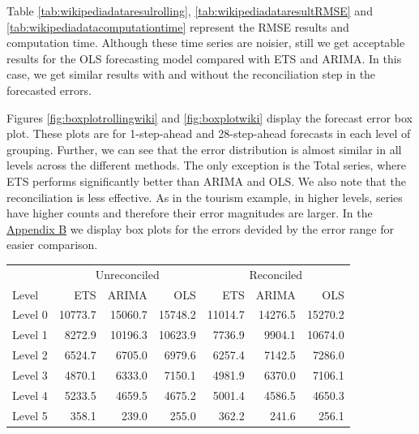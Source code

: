 \documentclass[11pt,a4paper,]{article}
\let\origtable\table
\let\endorigtable\endtable
\renewenvironment{table}[1][2] {
    \expandafter\origtable\expandafter[!htbp]
} {
    \endorigtable
}
\begin{document}
Table \ref{tab:wikipediadataresulrolling}, \ref{tab:wikipediadataresultRMSE} and \ref{tab:wikipediadatacomputationtime} represent the RMSE results and computation time. Although these time series are noisier, still we get acceptable results for the OLS forecasting model compared with ETS and ARIMA. In this case, we get similar results with and without the reconciliation step in the forecasted errors.

Figures \ref{fig:boxplotrollingwiki} and \ref{fig:boxplotwiki} display the forecast error box plot. These plots are for 1-step-ahead and 28-step-ahead forecasts in each level of grouping. Further, we can see that the error distribution is almost similar in all levels across the different methods. The only exception is the Total series, where ETS performs significantly better than ARIMA and OLS. We also note that the reconciliation is less effective. As in the tourism example, in higher levels, series have higher counts and therefore their error magnitudes are larger. In the \protect\hyperlink{appendixB}{Appendix B} we display box plots for the errors devided by the error range for easier comparison.

\begin{table}[!h]

\caption{\label{tab:wikipediadataresulrolling}Mean(RMSE) for ETS, ARIMA and OLS with and without reconciliation - 1-step-ahead - Wikipedia dataset}
\centering
\begin{tabular}{lrrrrrr}
\toprule
\multicolumn{1}{c}{} & \multicolumn{3}{c}{Unreconciled} & \multicolumn{3}{c}{Reconciled} \\
\cmidrule(l{3pt}r{3pt}){2-4} \cmidrule(l{3pt}r{3pt}){5-7}
Level & ETS & ARIMA & OLS & ETS & ARIMA & OLS\\
\midrule
Level 0 & 10773.7 & 15060.7 & 15748.2 & 11014.7 & 14276.5 & 15270.2\\
Level 1 & 8272.9 & 10196.3 & 10623.9 & 7736.9 & 9904.1 & 10674.0\\
Level 2 & 6524.7 & 6705.0 & 6979.6 & 6257.4 & 7142.5 & 7286.0\\
Level 3 & 4870.1 & 6333.0 & 7150.1 & 4981.9 & 6370.0 & 7106.1\\
Level 4 & 5233.5 & 4659.5 & 4675.2 & 5001.4 & 4586.5 & 4650.3\\
Level 5 & 358.1 & 239.0 & 255.0 & 362.2 & 241.6 & 256.1\\
\bottomrule
\end{tabular}
\end{table}
\end{document}

